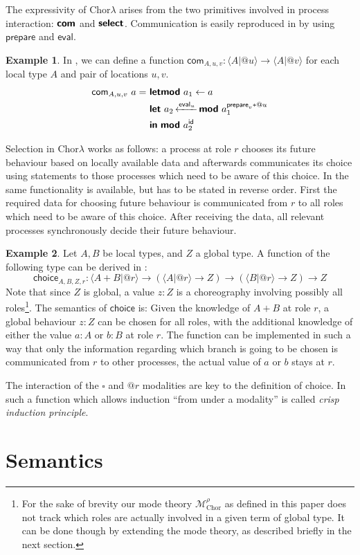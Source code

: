 \documentclass{scrartcl}
\theoremstyle{definition}
\newtheorem{example}{Example}
\theoremstyle{plain}
\begin{document}
The expressivity of Chor$\lambda$ arises from the two primitives involved in
process interaction: $\textsf{\textbf{com}}$ and $\textsf{\textbf{select}}$. Communication is
easily reproduced in \ChorMTT{} by using $\textsf{prepare}$ and $\textsf{eval}$.
\begin{example}
In \ChorMTT, we can define a function $\textsf{com}_{A,u,v} : \langle A | @u
\rangle \to \langle A | @v \rangle$ for each local type $A$ and pair of locations
$u,v$.
\begin{align*}\setlength{\jot}{0.5ex}
  \textsf{com}_{A,u,v}\ a =
  \ & \primitive{letmod}\ a_1 \leftarrow a\\
    & \primitive{let}\ a_2 \onleftarrow{\textsf{eval}_u}
        \primitive{mod}\ a_1^{\textsf{prepare}_v * @u}\\
    & \primitive{in}\ \primitive{mod}\ a_2^{\textsf{id}}
\end{align*}
\end{example}
Selection in Chor$\lambda$ works as follows: a process at role $r$
chooses its future behaviour based on locally available data and afterwards
communicates its choice using  statements to those processes which need to
be aware of this choice. In \ChorMTT{} the same functionality is available, but has
to be stated in reverse order. First the required data for choosing future
behaviour is communicated from $r$ to all roles which need to be aware of this
choice. After receiving the data, all relevant processes synchronously decide
their future behaviour.
\begin{example}
  Let $A, B$ be local types, and $Z$ a global type. A function of the following
  type can be derived in \ChorMTT:
  \[
    \textsf{choice}_{A,B,Z,r} : \langle A + B | @r \rangle
    \to (\langle A | @r \rangle \to Z)
    \to (\langle B | @r \rangle \to Z)
    \to Z
  \]
  Note that since $Z$ is global, a value $z : Z$ is a choreography involving
  possibly all roles\footnote{For the sake of brevity our mode theory
    $\mathcal{M}^{\rho}_{\textrm{Chor}}$ as defined in this paper does not track which
    roles are actually involved in a given term of global type. It can be done
    though by extending the mode theory, as described briefly in the next section.}. The semantics
  of $\textsf{choice}$ is: Given the knowledge of $A + B$ at role $r$, a global behaviour
  $z : Z$ can be chosen for all roles, with the additional knowledge of either
  the value $a : A$ or $b : B$ at role $r$. The function can be implemented in
  such a way that only the information regarding which branch is going to be
  chosen is communicated from $r$ to other processes, the actual value of $a$ or
  $b$ stays at $r$.

  The interaction of the $\square$ and $@r$ modalities are key to the definition
  of choice. In \cite{gratzer2023syntax} such a function which allows induction ``from under a
  modality'' is called \textit{crisp induction principle}.
\end{example}

\section{Semantics}




\end{document}
